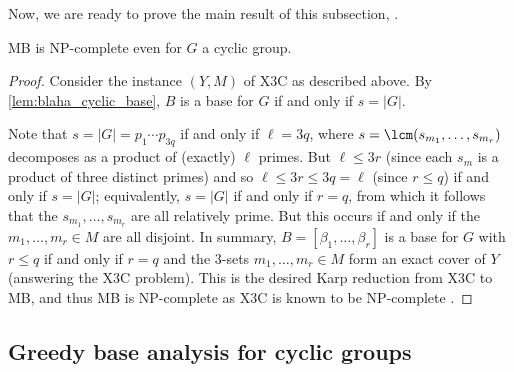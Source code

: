 Now, we are ready to prove the main result of this subsection, .

\begin{theorem}[Blaha, 1992]\label{thm:blaha_cyclic_NP_complete}
    MB is NP-complete even for $G$ a cyclic group.
\end{theorem}

\begin{proof}
    Consider the instance $(Y,M)$ of X3C as described above. By \autoref{lem:blaha_cyclic_base}, $B$ is a base for $G$ if and only if $s = |G|$.

    Note that $s = |G| = p_1 \dotsb p_{3q}$ if and only if $\ell = 3q$, where $s = \lcm(s_{m_1},\dotsc,s_{m_r})$ decomposes as a product of (exactly) $\ell$ primes. But $\ell \leq 3r$ (since each $s_m$ is a product of three distinct primes) and so $\ell \leq 3r \leq 3q = \ell$ (since $r \leq q$) if and only if $s = |G|$; equivalently, $s = |G|$ if and only if $r = q$, from which it follows that the $s_{m_1},\dotsc,s_{m_r}$ are all relatively prime. But this occurs if and only if the $m_1,\dotsc,m_r \in M$ are all disjoint. In summary, $B = [\beta_1,\dotsc,\beta_r]$ is a base for $G$ with $r \leq q$ if and only if $r = q$ and the 3-sets $m_1,\dotsc,m_r \in M$ form an exact cover of $Y$ (answering the X3C problem). This is the desired Karp reduction from X3C to MB, and thus MB is NP-complete as X3C is known to be NP-complete .
\end{proof}

\subsection{Greedy base analysis for cyclic groups}


